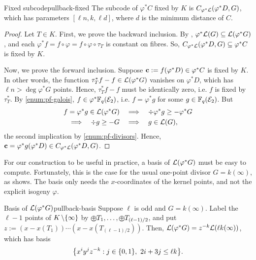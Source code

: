 \documentclass[twocolumn, 11pt]{scrartcl}
\begin{document}
\begin{proposition}{Fixed subcode}{pullback-fixed}
    The subcode of $\varphi^*C$ fixed by $K$ is $C_{\varphi^*\mathcal{L}}(\varphi^*D,G)$, which has parameters $[\ell n,k,\ell d]$, where $d$ is the minimum distance of $C$.
\end{proposition}

\begin{proof}
Let $T\in K$. First, we prove the backward inclusion. By , $\varphi^*\mathcal{L}(G)\subseteq\mathcal{L}(\varphi^*G)$, and each $\varphi^*f=f\circ\varphi=f\circ\varphi\circ\tau_T$ is constant on fibres. So, $C_{\varphi^*\mathcal{L}}(\varphi^*D,G)\subseteq\varphi^*C$ is fixed by $K$.

Now, we prove the forward inclusion. Suppose $\mathbf{c}:=f(\varphi^*D)\in\varphi^*C$ is fixed by $K$. In other words, the function $\tau_T^*f-f\in\mathcal{L}(\varphi^*G)$ vanishes on $\varphi^*D$, which has $\ell n>\deg\varphi^*G$ points. Hence, $\tau_T^*f-f$ must be identically zero, i.e. $f$ is fixed by $\tau_T^*$. By \ref{enum:pf-galois}, $f\in\varphi^*\mathbb{F}_q(\mathcal{E}_2)$, i.e. $f=\varphi^*g$ for some $g\in\mathbb{F}_q(\mathcal{E}_2)$. But
\begin{align*}
    f=\varphi^*g\in\mathcal{L}(\varphi^*G) &\quad\Longrightarrow\quad \div\varphi^*g\geq-\varphi^*G \\
    \Longrightarrow\quad \div g\geq-G
    &\quad\Longrightarrow\quad g\in\mathcal{L}(G),
\end{align*}
the second implication by \ref{enum:pf-divisors}. Hence, $\mathbf{c}=\varphi^*g(\varphi^*D)\in C_{\varphi^*\mathcal{L}}(\varphi^*D,G)$.
\end{proof}

For our construction to be useful in practice, a basis of $\mathcal{L}(\varphi^*G)$ must be easy to compute. Fortunately, this is the case for the usual one-point divisor $G=k(\infty)$, as  shows. The basis only needs the $x$-coordinates of the kernel points, and not the explicit isogeny $\varphi$.

\begin{proposition}{Basis of $\mathcal{L}(\varphi^*G)$}{pullback-basis}
    Suppose $\ell$ is odd and $G=k(\infty)$. Label the $\ell-1$ points of $K\operatorname{\setminus}\{\infty\}$ by $\opm T_1,\hdots,\opm T_{(\ell-1)/2}$, and put $z:=(x-x(T_1))\cdots(x-x(T_{(\ell-1)/2}))$.
    Then, $\mathcal{L}(\varphi^*G)=z^{-k}\mathcal{L}(\ell k(\infty))$, which has basis
    \[ \set*{x^iy^jz^{-k}:j\in\set{0,1},\ 2i+3j\leq\ell k}. \]
\end{proposition}
\end{document}
